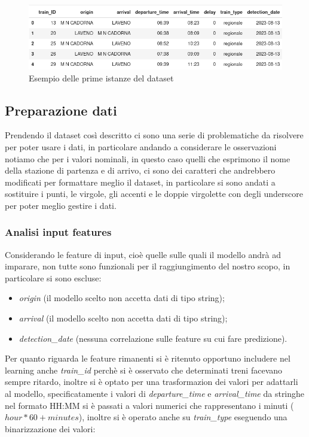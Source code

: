 \documentclass[italian,12pt,a4paper]{article}
\begin{document}
				\begin{figure}[!h]
					\centering
					\includegraphics[width=1.1\linewidth]{img/dataset}
					\caption{Esempio delle prime istanze del dataset}
				\end{figure}
	
		\subsection{Preparazione dati}
			Prendendo il dataset così descritto ci sono una serie di problematiche da risolvere per poter usare i dati, in particolare andando a considerare le osservazioni notiamo che per i valori nominali, in questo caso quelli che esprimono il nome della stazione di partenza e di arrivo, ci sono dei caratteri che andrebbero modificati per formattare meglio il dataset, in particolare si sono andati a sostituire i punti, le virgole, gli accenti e le doppie virgolette con degli underscore per poter meglio gestire i dati.
		
			\subsubsection{Analisi input features}
				Considerando le feature di input, cioè quelle sulle quali il modello andrà ad imparare, non tutte sono funzionali per il raggiungimento del nostro scopo, in particolare si sono escluse:
				
				\begin{itemize}
					\item \textit{origin} (il modello scelto non accetta dati di tipo string);
					\item \textit{arrival} (il modello scelto non accetta dati di tipo string);
					\item \textit{detection\_date} (nessuna correlazione sulle feature su cui fare predizione).
				\end{itemize}
				
				Per quanto riguarda le feature rimanenti si è ritenuto opportuno includere nel learning anche \textit{train\_id} perchè si è osservato che determinati treni facevano sempre ritardo, inoltre si è optato per una trasformazion dei valori per adattarli al modello, specificatamente i valori di \textit{departure\_time} e \textit{arrival\_time} da stringhe nel formato HH:MM si è passati a valori numerici che rappresentano i minuti ($hour*60+minutes$), inoltre si è operato anche su \textit{train\_type} eseguendo una binarizzazione dei valori:
				
\end{document}
